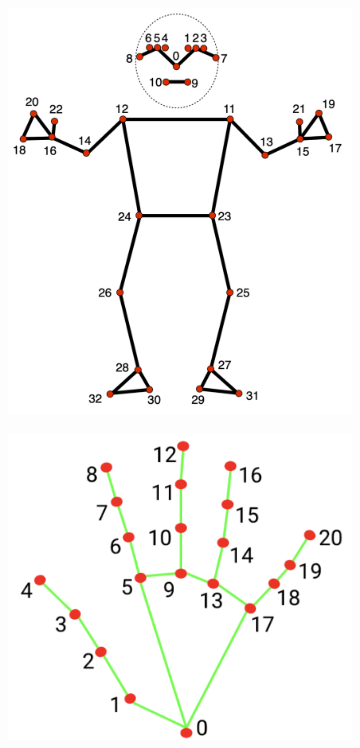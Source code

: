\documentclass[acmsmall, screen]{acmart}
\begin{document}
\begin{figure}[htbp]
  \centering
  \begin{subfigure}[b]{0.35\linewidth}
    \centering
    \includegraphics[width=\linewidth]{assets/pose-landmarks.png}
  \end{subfigure}%
  \hspace{1em}%
  \begin{subfigure}[b]{0.35\linewidth}
    \centering
    \includegraphics[width=\linewidth]{assets/hand-landmarks.png}

\end{subfigure}
\end{figure}
\end{document}
